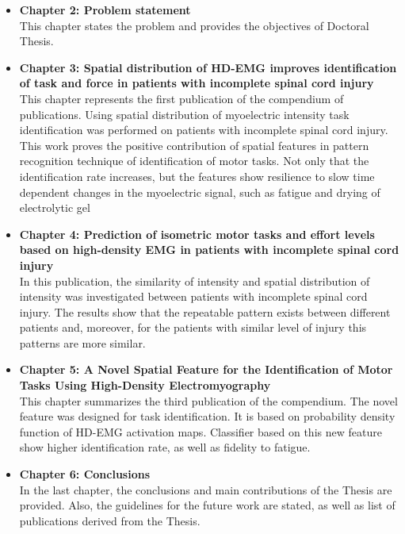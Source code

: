 \begin{itemize}
\item \textbf{Chapter 2: Problem statement}\\
	This chapter states the problem and provides the objectives of Doctoral Thesis.
	
\item \textbf{Chapter 3: Spatial distribution of HD-EMG improves identification of task and force in patients with incomplete spinal cord injury}\\
	This chapter represents the first publication of the compendium of publications. Using spatial distribution of myoelectric intensity task identification was performed on patients with incomplete spinal cord injury. This work proves the positive contribution of spatial features in pattern recognition technique of identification of motor tasks. Not only that the identification rate increases, but the features show resilience to slow time dependent changes in the myoelectric signal, such as fatigue and drying of electrolytic gel
	
\item \textbf{Chapter 4: Prediction of isometric motor tasks and effort levels based on high-density EMG in patients with incomplete spinal cord injury}\\
	In this publication, the similarity of intensity and spatial distribution of intensity was investigated between patients with incomplete spinal cord injury. The results show that the repeatable pattern exists between different patients and, moreover, for the patients with similar level of injury this patterns are more similar.

\item \textbf{Chapter 5: A Novel Spatial Feature for the Identification of Motor Tasks Using High-Density Electromyography}\\
	This chapter summarizes the  third publication of the compendium. The novel feature was designed for task identification. It is based on probability density function of HD-EMG activation maps. Classifier based on this new feature show higher identification rate, as well as fidelity to fatigue.

\item \textbf{Chapter 6: Conclusions}\\
	In the last chapter, the conclusions and main contributions of the Thesis are provided. Also, the guidelines for the future work are stated, as well as list of publications derived from the Thesis.

\end{itemize}





\

